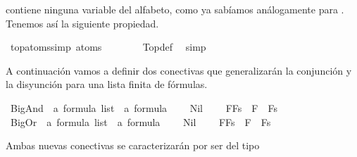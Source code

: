 \begin{isabellebody}
\begin{isamarkuptext}
  contiene ninguna variable del alfabeto, como ya sabíamos análogamente 
  para . Tenemos así la siguiente propiedad.%
\end{isamarkuptext}\isamarkuptrue%
\isamarkupfalse%
\ top{\isacharunderscore}atoms{\isacharunderscore}simp{\isacharcolon}\ {\isachardoublequoteopen}atoms\ {\isasymtop}\ {\isacharequal}\ {\isacharbraceleft}{\isacharbraceright}{\isachardoublequoteclose}\ \isanewline
%
\isadelimproof
\ \ %
\endisadelimproof
%
\isatagproof
{}\isamarkupfalse%
\ Top{\isacharunderscore}def\ \isamarkupfalse%
\ simp%
\endisatagproof
{\isafoldproof}%
%
\isadelimproof
%
\endisadelimproof
%
\begin{isamarkuptext}%
A continuación vamos a definir dos conectivas que generalizarán la 
  conjunción y la disyunción para una lista finita de fórmulas.%
\end{isamarkuptext}\isamarkuptrue%
\isamarkupfalse%
\ BigAnd\ {\isacharcolon}{\isacharcolon}\ {\isachardoublequoteopen}{\isacharprime}a\ formula\ list\ {\isasymRightarrow}\ {\isacharprime}a\ formula{\isachardoublequoteclose}\ {\isacharparenleft}{\isachardoublequoteopen}\isactrlbold {\isasymAnd}{\isacharunderscore}{\isachardoublequoteclose}{\isacharparenright}\ \isanewline
\ \ {\isachardoublequoteopen}\isactrlbold {\isasymAnd}Nil\ {\isacharequal}\ {\isacharparenleft}\isactrlbold {\isasymnot}{\isasymbottom}{\isacharparenright}{\isachardoublequoteclose}\ \isanewline
{\isacharbar}\ {\isachardoublequoteopen}\isactrlbold {\isasymAnd}{\isacharparenleft}F{\isacharhash}Fs{\isacharparenright}\ {\isacharequal}\ F\ \isactrlbold {\isasymand}\ \isactrlbold {\isasymAnd}Fs{\isachardoublequoteclose}\isanewline
\isanewline
{}\isamarkupfalse%
\ BigOr\ {\isacharcolon}{\isacharcolon}\ {\isachardoublequoteopen}{\isacharprime}a\ formula\ list\ {\isasymRightarrow}\ {\isacharprime}a\ formula{\isachardoublequoteclose}\ {\isacharparenleft}{\isachardoublequoteopen}\isactrlbold {\isasymOr}{\isacharunderscore}{\isachardoublequoteclose}{\isacharparenright}\ \isanewline
\ \ {\isachardoublequoteopen}\isactrlbold {\isasymOr}Nil\ {\isacharequal}\ {\isasymbottom}{\isachardoublequoteclose}\ \isanewline
{\isacharbar}\ {\isachardoublequoteopen}\isactrlbold {\isasymOr}{\isacharparenleft}F{\isacharhash}Fs{\isacharparenright}\ {\isacharequal}\ F\ \isactrlbold {\isasymor}\ \isactrlbold {\isasymOr}Fs{\isachardoublequoteclose}%
\begin{isamarkuptext}%
Ambas nuevas conectivas se caracterizarán por ser del tipo 

\end{isamarkuptext}
\end{isabellebody}
